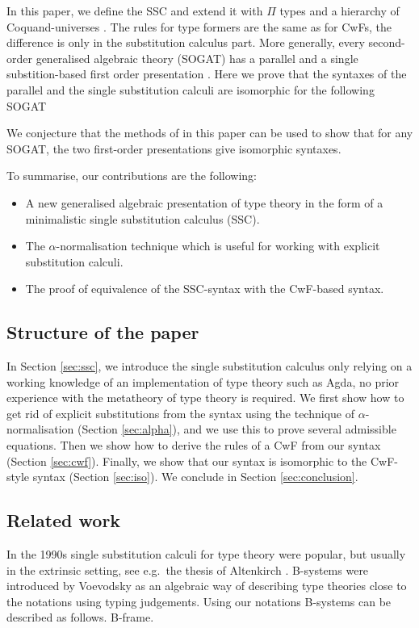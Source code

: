 \documentclass[sigplan,10pt,anonymous,review]{acmart}\settopmatter{printfolios=true,printccs=false,printacmref=false}
\begin{document}
In this paper, we define the SSC and extend it with
$\Pi$ types and a hierarchy of Coquand-universes
\cite{coquandUniverse}. The rules for type formers are the same as for
CwFs, the difference is only in the substitution calculus part. More
generally, every second-order generalised algebraic theory (SOGAT) has
a parallel and a single substition-based first order presentation
\cite{DBLP:conf/fscd/KaposiX24}. Here we prove that the syntaxes of
the parallel and the single substitution calculi are isomorphic for
the following SOGAT 

We conjecture that the methods of in this paper can be used to show
that for any SOGAT, the two first-order presentations give isomorphic
syntaxes.

To summarise, our contributions are the following:
\begin{itemize}
\item A new generalised algebraic presentation of type theory in the
  form of a minimalistic single substitution calculus (SSC).
\item The $\alpha$-normalisation technique which is useful for working
  with explicit substitution calculi.
\item The proof of equivalence of the SSC-syntax with the CwF-based
  syntax.
\end{itemize}

\subsection{Structure of the paper}

In Section \ref{sec:ssc}, we introduce the single substitution
calculus only relying on a working knowledge of an implementation of
type theory such as Agda, no prior experience with the metatheory of
type theory is required. We first show how to get rid of explicit
substitutions from the syntax using the technique of
$\alpha$-normalisation (Section \ref{sec:alpha}), and we use this to
prove several admissible equations. Then we show how to derive the
rules of a CwF from our syntax (Section \ref{sec:cwf}). Finally, we
show that our syntax is isomorphic to the CwF-style syntax (Section
\ref{sec:iso}). We conclude in Section \ref{sec:conclusion}.

\subsection{Related work}

In the 1990s single substitution calculi for type theory were popular,
but usually in the extrinsic setting, see e.g.\ the thesis of
Altenkirch \cite{alti:phd93}. B-systems were introduced by Voevodsky
\cite{voevodsky2014bsystems} as an algebraic way of describing type
theories close to the notations using typing judgements. Using our
notations B-systems can be described as follows. B-frame.
\end{document}
